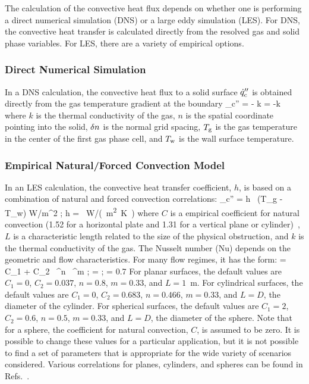 The calculation of the convective heat flux depends on whether one is performing a direct numerical simulation (DNS) or a large eddy simulation (LES). For DNS, the convective heat transfer is calculated directly from the resolved gas and solid phase variables. For LES, there are a variety of empirical options.

\subsubsection{Direct Numerical Simulation}

In a DNS calculation, the convective heat flux to a solid surface $\dot{q}''_{\rm c}$ is obtained directly from the gas temperature gradient at the boundary
\be
   \dq_{\rm c}'' = - k \;  = -k 
\ee
where $k$ is the thermal conductivity of the gas, $n$ is the spatial coordinate pointing into the solid, $\delta n$ is the normal grid spacing, $T_{\rm g}$ is the gas temperature in the center of the first gas phase cell, and $T_{\rm w}$ is the wall surface temperature.

\subsubsection{Empirical Natural/Forced Convection Model}

In an LES calculation, the convective heat transfer coefficient, $h$, is based on a combination of natural and forced convection correlations:
\be \dq_{\rm c}'' = h \, (T_{\rm g} - T_{\rm w}) \quad \hbox{W/m}^2 \quad ; \quad
    h = \max \,   \quad  \si{W/(m^2.K)}
    \label{eq:qconv}
\ee
where $C$ is a empirical coefficient for natural convection (1.52 for a horizontal plate and 1.31 for a vertical plane or cylinder)~\cite{Holman:1}, $L$ is a characteristic length related to the size of the physical obstruction, and $k$ is the thermal conductivity of the gas. The Nusselt number (Nu) depends on the geometric and flow characteristics. For many flow regimes, it has the form:
\be
   \NU = C_1 + C_2 \, \RE^n \, \PR^m  \quad ; \quad \RE =  \quad ; \quad \PR = 0.7
\ee
For planar surfaces, the default values are $C_1=0$, $C_2=0.037$, $n=0.8$, $m=0.33$, and $L=1$~m. For cylindrical surfaces, the default values are $C_1=0$, $C_2=0.683$, $n=0.466$, $m=0.33$, and $L=D$, the diameter of the cylinder. For spherical surfaces, the default values are $C_1=2$, $C_2=0.6$, $n=0.5$, $m=0.33$, and $L=D$, the diameter of the sphere. Note that for a sphere, the coefficient for natural convection, $C$, is assumed to be zero. It is possible to change these values for a particular application, but it is not possible to find a set of parameters that is appropriate for the wide variety of scenarios considered. Various correlations for planes, cylinders, and spheres can be found in Refs.~\cite{Holman:1,Incropera:1}.


